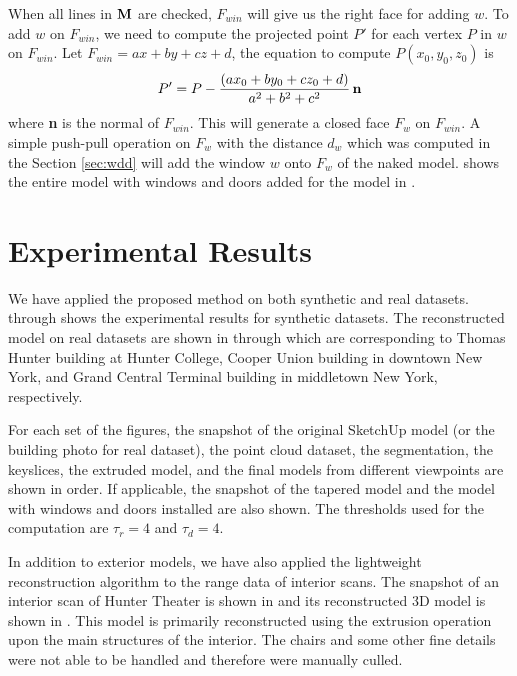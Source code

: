 When all lines in ${\bf M}$ are checked,
$F_{win}$ will give us the right face for adding $w$.
To add $w$ on $F_{win}$, we need to compute the projected point $P'$
for each vertex $P$ in $w$ on $F_{win}$.
Let $F_{win} = ax + by + cz + d$, the equation to compute $P(x_0, y_0, z_0)$ is
\begin{equation*} %
P' = P - \frac{(ax_0+by_0+cz_0+d)}{a^2+b^2+c^2}\,{\bf n}
\end{equation*}
where {\bf n} is the normal of $F_{win}$.
This will generate a closed face $F_w$ on $F_{win}$.
A simple push-pull operation on $F_w$ with the distance $d_w$
which was computed in the Section \ref{sec:wdd}
will add the window $w$ onto $F_w$ of the naked model.
 shows the entire model
with windows and doors added for the model in .


\section{Experimental Results}

We have applied the proposed method on both synthetic
and real datasets.
 through  shows the experimental results
for synthetic datasets.
The reconstructed model on real datasets are shown in 
through  which are corresponding to
Thomas Hunter building at Hunter College,
Cooper Union building in downtown New York, and
Grand Central Terminal building in middletown New York, respectively.

For each set of the figures, the snapshot of
the original SketchUp model (or the building photo for real dataset),
the point cloud dataset,
the segmentation,
the keyslices,
the extruded model,
and the final models from different viewpoints are shown in order.
If applicable, the snapshot of the tapered model and
the model with windows and doors installed are also shown.
The thresholds used for the computation are $\tau_r = 4$ and $\tau_d = 4$.


In addition to exterior models,
we have also applied the lightweight
reconstruction algorithm to the range data of interior scans.
The snapshot of an interior scan of Hunter Theater is shown in 
and its reconstructed 3D model is shown in .
This model is primarily reconstructed using the extrusion operation
upon the main structures of the interior.
The chairs and some other fine details were not able to be handled
and therefore were manually culled.

